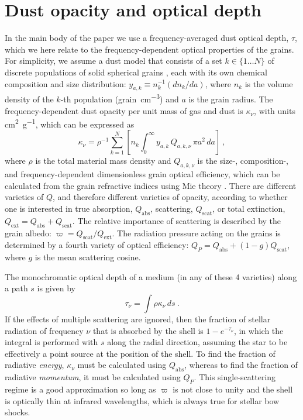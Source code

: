 \documentclass[useAMS, usenatbib, a4paper]{mnras}
\begin{document}
\section{Dust opacity and optical depth}
\label{app:dust-opacity}

In the main body of the paper we use a frequency-averaged dust optical
depth, \(\tau\), which we here relate to the frequency-dependent optical
properties of the grains.  For simplicity, we assume a dust model that
consists of a set \(k \in \{1 \dots N\}\) of discrete populations of
solid spherical grains \citep[e.g.][]{Desert:1990a}, each with its own
chemical composition and size distribution:
\(y_{a,k} \equiv n_k^{-1} (d n_k / d a)\), where \(n_k\) is the volume
density of the \(k\)-th population (\si{grain.cm^{-3}}) and \(a\) is
the grain radius. The frequency-dependent dust opacity per unit mass
of gas and dust is \(\kappa_\nu\), with units \si{cm^2.g^{-1}}, which can be
expressed as
\begin{equation}
  \label{eq:dust-opacity-frequency}
  \kappa_\nu = \rho^{-1} \sum_{k=1}^{N} \left[  n_k \int_0^\infty \!\!y_{a,k} \, Q_{a,k,\nu} \,\pi a^2 \, da\right]\ ,
\end{equation}
where \(\rho\) is the total material mass density and \(Q_{a,k,\nu}\) is
the size-, composition-, and frequency-dependent dimensionless grain
optical efficiency, which can be calculated from the grain refractive
indices using Mie theory \citep{Bohren:1983a}.  There are different
varieties of \(Q\), and therefore different varieties of opacity,
according to whether one is interested in true absorption,
\(Q_{\text{abs}}\), scattering, \(Q_{\text{scat}}\), or total
extinction, \(Q_{\text{ext}} = Q_{\text{abs}} + Q_{\text{scat}}\).
The relative importance of scattering is described by the grain
albedo: \(\varpi = Q_{\text{scat}}/Q_{\text{ext}}\).  The radiation
pressure acting on the grains is determined by a fourth variety of
optical efficiency:
\(Q_P = Q_{\text{abs}} + (1 - g) Q_{\text{scat}}\), where \(g\) is the
mean scattering cosine.

The monochromatic optical depth of a medium (in any of these 4
varieties) along a path \(s\) is given by
\begin{equation}
  \label{eq:tau-monochromatic}
  \tau_\nu = \int \rho \kappa_\nu \, ds \ .
\end{equation}
If the effects of multiple scattering are ignored, then the fraction
of stellar radiation of frequency \(\nu\) that is absorbed by the shell
is \(1 - e^{-\tau_\nu}\), in which the integral is performed with
\(s\) along the radial direction, assuming the star to be effectively
a point source at the position of the shell.  To find the fraction of
radiative \emph{energy}, \(\kappa_\nu\) must be calculated using
\(Q_{\text{abs}}\), whereas to find the fraction of radiative
\emph{momentum}, it must be calculated using \(Q_P\).  This
single-scattering regime \citep[e.g.][]{Wibking:2018a} is a good
approximation so long as \(\varpi\) is not close to unity and the
shell is optically thin at infrared wavelengths, which is always true
for stellar bow shocks.
\end{document}

